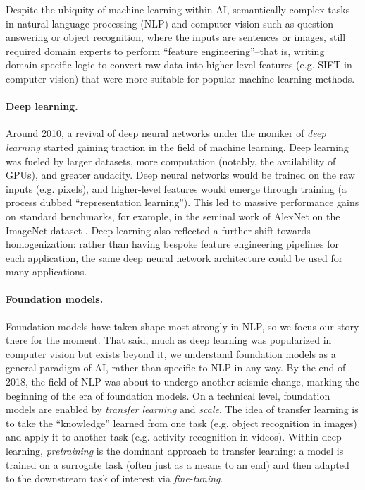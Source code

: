 Despite the ubiquity of machine learning within AI, semantically complex tasks in natural language processing (NLP) and computer vision such as question answering or object recognition, where the inputs are sentences or images, still required domain experts to perform ``feature engineering''--that is, writing domain-specific logic to convert raw data into higher-level features (e.g. SIFT \citep{lowe1999sift} in computer vision) that were more suitable for popular machine learning methods.

\paragraph{Deep learning.}

Around 2010, a revival of deep neural networks under the moniker of \emph{deep learning} \citep{lecun2015deep} started gaining traction in the field of machine learning. Deep learning was fueled by larger datasets, more computation (notably, the availability of GPUs), and greater audacity. Deep neural networks would be trained on the raw inputs (e.g. pixels), and higher-level features would emerge through training (a process dubbed  ``representation learning''). This led to massive performance gains on standard benchmarks, for example, in the seminal work of AlexNet \citep{krizhevsky2012imagenet} on the ImageNet dataset \citep{deng2009imagenet}. Deep learning also reflected a further shift towards homogenization: rather than having bespoke feature engineering pipelines for each application, the same deep neural network architecture could be used for many applications.

\paragraph{Foundation models.}

Foundation models have taken shape most strongly in NLP, so we focus our story there for the moment. That said, much as deep learning was popularized in computer vision but exists beyond it, we understand foundation models as a general paradigm of AI, rather than specific to NLP in any way. By the end of 2018, the field of NLP was about to undergo another seismic change, marking the beginning of the era of foundation models. On a technical level, foundation models are enabled by
\emph{transfer learning} \citep{thrun1998lifelong} and \emph{scale}.
The idea of transfer learning is to take the ``knowledge'' learned from one task (e.g. object recognition in images) and apply it to another task (e.g. activity recognition in videos). Within deep learning, \emph{pretraining} is the dominant approach to transfer learning: a model is trained on a surrogate task (often just as a means to an end) and then adapted to the downstream task of interest via \emph{fine-tuning}.

